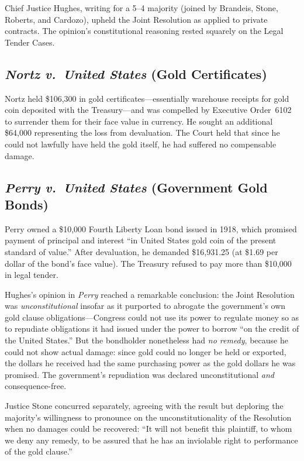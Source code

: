 \documentclass[12pt]{article}
\begin{document}
Chief Justice Hughes, writing for a 5--4 majority (joined by Brandeis,
Stone, Roberts, and Cardozo), upheld the Joint Resolution as applied to
private contracts. The opinion's constitutional reasoning rested
squarely on the Legal Tender Cases.

\subsection{\textit{Nortz v.\ United States} (Gold Certificates)}

Nortz held \$106,300 in gold certificates---essentially warehouse
receipts for gold coin deposited with the Treasury---and was compelled
by Executive Order~6102 to surrender them for their face value in
currency. He sought an additional \$64,000 representing the loss from
devaluation. The Court held that since he could not lawfully have held
the gold itself, he had suffered no compensable damage.

\subsection{\textit{Perry v.\ United States} (Government Gold Bonds)}

Perry owned a \$10,000 Fourth Liberty Loan bond issued in 1918, which
promised payment of principal and interest ``in United States gold coin
of the present standard of value.'' After devaluation, he demanded
\$16,931.25 (at \$1.69 per dollar of the bond's face value). The
Treasury refused to pay more than \$10,000 in legal tender.

Hughes's opinion in \textit{Perry} reached a remarkable conclusion: the
Joint Resolution was \textit{unconstitutional} insofar as it purported
to abrogate the government's own gold clause obligations---Congress
could not use its power to regulate money so as to repudiate obligations
it had issued under the power to borrow ``on the credit of the United
States.'' But the bondholder nonetheless had \textit{no remedy}, because
he could not show actual damage: since gold could no longer be held or
exported, the dollars he received had the same purchasing power as the
gold dollars he was promised. The government's repudiation was declared
unconstitutional \textit{and} consequence-free.

Justice Stone concurred separately, agreeing with the result but
deploring the majority's willingness to pronounce on the
unconstitutionality of the Resolution when no damages could be
recovered: ``It will not benefit this plaintiff, to whom we deny any
remedy, to be assured that he has an inviolable right to performance
of the gold clause.''
\end{document}
